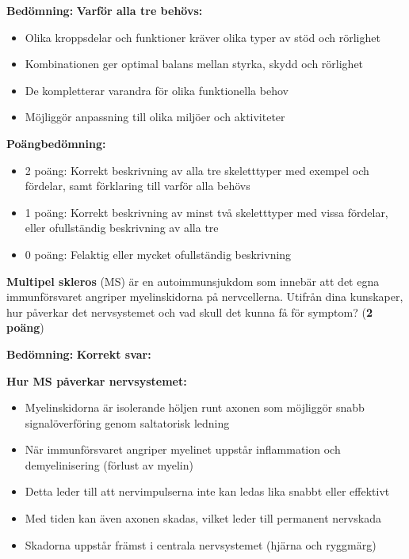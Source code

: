 \documentclass{exam}
\newenvironment{answer}
  {\begin{framed}\color{blue}\textbf{Bedömning:} }
  {\end{framed}}
\begin{document}
\begin{questions}
\begin{answer}
\textbf{Varför alla tre behövs:}
\begin{itemize}
  \item Olika kroppsdelar och funktioner kräver olika typer av stöd och rörlighet
  \item Kombinationen ger optimal balans mellan styrka, skydd och rörlighet
  \item De kompletterar varandra för olika funktionella behov
  \item Möjliggör anpassning till olika miljöer och aktiviteter
\end{itemize}

\textbf{Poängbedömning:}
\begin{itemize}
  \item 2 poäng: Korrekt beskrivning av alla tre skeletttyper med exempel och fördelar, samt förklaring till varför alla behövs
  \item 1 poäng: Korrekt beskrivning av minst två skeletttyper med vissa fördelar, eller ofullständig beskrivning av alla tre
  \item 0 poäng: Felaktig eller mycket ofullständig beskrivning
\end{itemize}
\end{answer}
\vspace{5mm}

\question \textbf{Multipel skleros} (MS) är en autoimmunsjukdom som innebär att det egna immunförsvaret angriper myelinskidorna på nervcellerna. Utifrån dina kunskaper, hur påverkar det nervsystemet och vad skull det kunna få för symptom? (\textbf{2 poäng})

\vspace{10mm}

\begin{answer}
\textbf{Korrekt svar:}

\textbf{Hur MS påverkar nervsystemet:}
\begin{itemize}
  \item Myelinskidorna är isolerande höljen runt axonen som möjliggör snabb signalöverföring genom saltatorisk ledning
  \item När immunförsvaret angriper myelinet uppstår inflammation och demyelinisering (förlust av myelin)
  \item Detta leder till att nervimpulserna inte kan ledas lika snabbt eller effektivt
  \item Med tiden kan även axonen skadas, vilket leder till permanent nervskada
  \item Skadorna uppstår främst i centrala nervsystemet (hjärna och ryggmärg)
\end{itemize}


\end{answer}
\end{questions}
\end{document}
